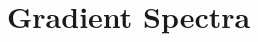 \documentclass[
  journal=pasa,
  manuscript=research-paper, %
  year=2021,
  volume=37,
]{cup-journal}
\begin{document}




\appendix

\section{Gradient Spectra}
\end{document}

